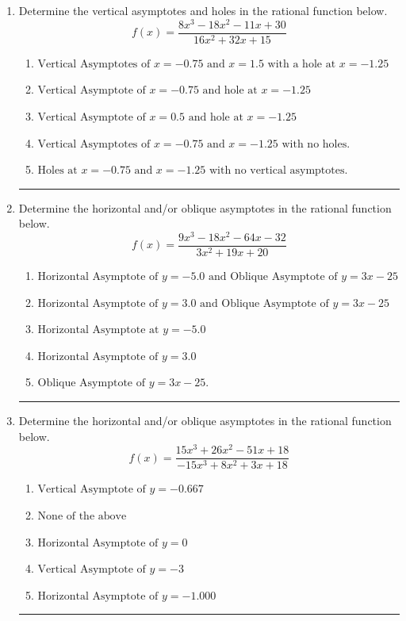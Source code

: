 \documentclass[14pt]{extbook}
\newcommand{\litem}[1]{\item#1\hspace*{-1cm}\rule{\textwidth}{0.4pt}}
\begin{document}
\begin{enumerate}
{\begin{enumerate}[label=\Alph*.]
\end{enumerate} }
\litem{
Determine the vertical asymptotes and holes in the rational function below.\[ f(x) = \frac{8x^{3} -18 x^{2} -11 x + 30}{16x^{2} +32 x + 15} \]\begin{enumerate}[label=\Alph*.]
\item \( \text{Vertical Asymptotes of } x = -0.75 \text{ and } x = 1.5 \text{ with a hole at } x = -1.25 \)
\item \( \text{Vertical Asymptote of } x = -0.75 \text{ and hole at } x = -1.25 \)
\item \( \text{Vertical Asymptote of } x = 0.5 \text{ and hole at } x = -1.25 \)
\item \( \text{Vertical Asymptotes of } x = -0.75 \text{ and } x = -1.25 \text{ with no holes.} \)
\item \( \text{Holes at } x = -0.75 \text{ and } x = -1.25 \text{ with no vertical asymptotes.} \)

\end{enumerate} }
\litem{
Determine the horizontal and/or oblique asymptotes in the rational function below.\[ f(x) = \frac{9x^{3} -18 x^{2} -64 x -32}{3x^{2} +19 x + 20} \]\begin{enumerate}[label=\Alph*.]
\item \( \text{Horizontal Asymptote of } y = -5.0 \text{ and Oblique Asymptote of } y = 3x -25 \)
\item \( \text{Horizontal Asymptote of } y = 3.0 \text{ and Oblique Asymptote of } y = 3x -25 \)
\item \( \text{Horizontal Asymptote at } y = -5.0 \)
\item \( \text{Horizontal Asymptote of } y = 3.0  \)
\item \( \text{Oblique Asymptote of } y = 3x -25. \)

\end{enumerate} }
\litem{
Determine the horizontal and/or oblique asymptotes in the rational function below.\[ f(x) = \frac{15x^{3} +26 x^{2} -51 x + 18}{-15x^{3} +8 x^{2} +3 x + 18} \]\begin{enumerate}[label=\Alph*.]
\item \( \text{Vertical Asymptote of } y = -0.667  \)
\item \( \text{None of the above} \)
\item \( \text{Horizontal Asymptote of } y = 0  \)
\item \( \text{Vertical Asymptote of } y = -3  \)
\item \( \text{Horizontal Asymptote of } y = -1.000  \)


\end{enumerate}}
\end{enumerate}
\end{document}
